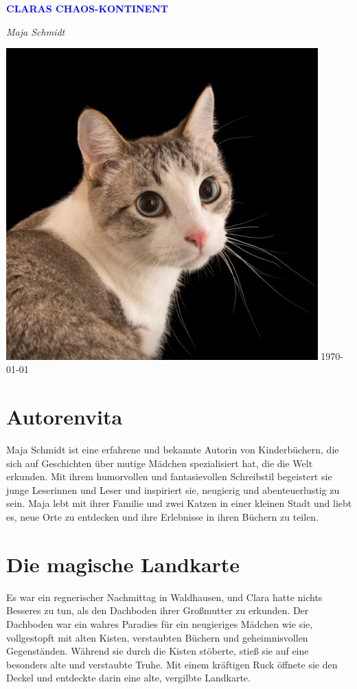 \documentclass[12pt]{article}
\begin{document}
\begin{titlepage}
    \centering
    \vspace*{3cm}
    {\Huge\bfseries\textcolor{blue}{\MakeUppercase{ Claras Chaos-Kontinent }}\par}
    \vspace{0.5cm}
    {\Large\textit{ Maja Schmidt }\par}
    \vfill
    \includegraphics[width=0.9\textwidth]{ cover.jpg }
    \vfill
    \today
\end{titlepage}

\section*{Autorenvita}
\vspace{4cm}
Maja Schmidt ist eine erfahrene und bekannte Autorin von Kinderbüchern, die sich auf Geschichten über mutige Mädchen spezialisiert hat, die die Welt erkunden. Mit ihrem humorvollen und fantasievollen Schreibstil begeistert sie junge Leserinnen und Leser und inspiriert sie, neugierig und abenteuerlustig zu sein. Maja lebt mit ihrer Familie und zwei Katzen in einer kleinen Stadt und liebt es, neue Orte zu entdecken und ihre Erlebnisse in ihren Büchern zu teilen.

\clearpage
\tableofcontents
\clearpage


\section{ Die magische Landkarte }
 Es war ein regnerischer Nachmittag in Waldhausen, und Clara hatte nichts Besseres zu tun, als den Dachboden ihrer Großmutter zu erkunden. Der Dachboden war ein wahres Paradies für ein neugieriges Mädchen wie sie, vollgestopft mit alten Kisten, verstaubten Büchern und geheimnisvollen Gegenständen. Während sie durch die Kisten stöberte, stieß sie auf eine besonders alte und verstaubte Truhe. Mit einem kräftigen Ruck öffnete sie den Deckel und entdeckte darin eine alte, vergilbte Landkarte.
\end{document}
